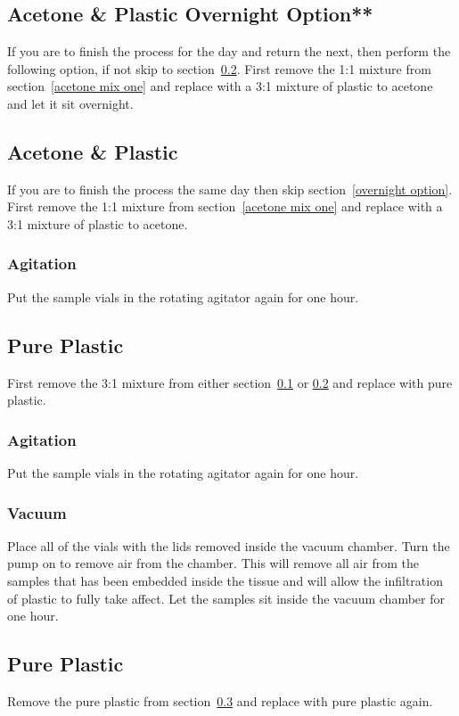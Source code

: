 \subsection{Acetone \& Plastic Overnight Option**}\label{overnight option}
If you are to finish the process for the day and return the next, then perform
the following option, if not skip to section~\ref{continuing option}.  First
remove the 1:1 mixture from section~\ref{acetone mix one} and replace with a
3:1 mixture of plastic to acetone and let it sit overnight.

\subsection{Acetone \& Plastic}\label{continuing option}
If you are to finish the process the same day then skip section~\ref{overnight
option}.  First remove the 1:1 mixture from section~\ref{acetone mix one} and
replace with a 3:1 mixture of plastic to acetone.

\subsubsection{Agitation}
Put the sample vials in the rotating agitator again for one hour.

\subsection{Pure Plastic}\label{plastic}
First remove the 3:1 mixture from either section~\ref{overnight option} or
\ref{continuing option} and replace with pure plastic.

\subsubsection{Agitation}
Put the sample vials in the rotating agitator again for one hour.
\subsubsection{Vacuum}
Place all of the vials with the lids removed inside the vacuum chamber.  Turn
the pump on to remove air from the chamber.  This will remove all air from the
samples that has been embedded inside the tissue and will allow the
infiltration of plastic to fully take affect.  Let the samples sit inside the
vacuum chamber for one hour.
  
\subsection{Pure Plastic}\label{plastic 2}
Remove the pure plastic from section~\ref{plastic} and replace with pure
plastic again.

